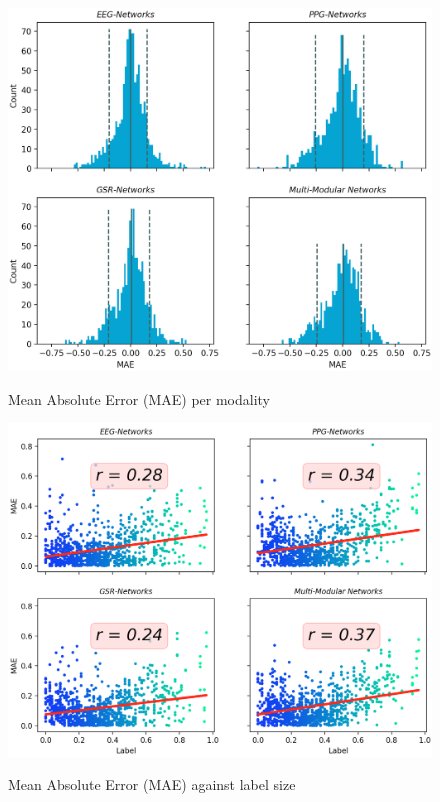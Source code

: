 \documentclass[12pt]{article}
\begin{document}
\begin{figure}
\caption{Mean Absolute Error (MAE) per modality}
\bigskip
\includegraphics[scale=0.7]{mae_hist.png}
\label{fig:mae_hist}
\end{figure}
\restoregeometry


\begin{figure}
\caption{Mean Absolute Error (MAE) against label size}
\bigskip
\includegraphics[scale=0.67]{mae_scatter.png}
\label{fig:mae_scatter}
\end{figure}
\restoregeometry
\end{document}
